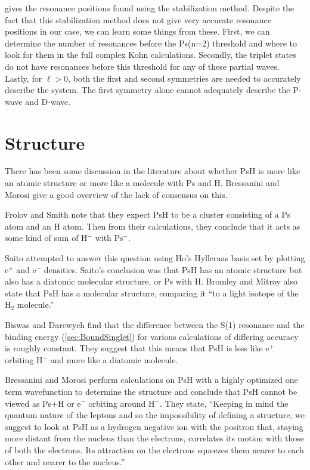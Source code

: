 \documentclass[Dissertation.tex]{subfiles}
\begin{document}
 gives the resonance positions found using the stabilization method. Despite the fact that this stabilization method does not give very accurate resonance positions in our case, we can learn some things from these. First, we can determine the number of resonances before the Ps(n=2) threshold and where to look for them in the full complex Kohn calculations. Secondly, the triplet states do not have resonances before this threshold for any of these partial waves. Lastly, for $\ell > 0$, both the first and second symmetries are needed to accurately describe the system. The first symmetry alone cannot adequately describe the P-wave and D-wave.


\section{Structure}
\label{sec:PsHStructure}
There has been some discussion in the literature about whether PsH is more like an atomic structure or more like a molecule with Ps and H. Bressanini and Morosi \cite{Bressanini2003} give a good overview of the lack of consensus on this. 

Frolov and Smith \cite{Frolov1997c} note that they expect PsH to be a cluster consisting of a Ps atom and an H atom. Then from their calculations, they conclude that it acts as some kind of sum of H$^-$ with Ps$^-$.

Saito \cite{Saito2000} attempted to answer this question using Ho's \cite{Ho1986} Hylleraas basis set by plotting e$^+$ and e$^-$ densities. Saito's conclusion was that PsH has an atomic structure but also has a diatomic molecular structure, or Ps with H. Bromley and Mitroy \cite{Bromley2001} also state that PsH has a molecular structure, comparing it ``to a light isotope of the H$_2$ molecule.''

Biswas and Darewych \cite{Biswas2002} find that the difference between the S(1) resonance and the binding energy (\cref{sec:BoundSinglet}) for various calculations of differing accuracy is roughly constant. They suggest that this means that PsH is less like e$^+$ orbiting H$^-$ and more like a diatomic molecule.

\cite{Mitroy2002}

Bressanini and Morosi \cite{Bressanini2003} perform calculations on PsH with a highly optimized one term wavefunction to determine the structure and conclude that PsH cannot be viewed as Ps+H or e$^-$ orbiting around H$^-$. They state, ``Keeping in mind the quantum nature of the leptons and so the impossibility of defining a structure, we suggest to look at PsH as a hydrogen negative ion with the positron that, staying more distant from the nucleus than the electrons, correlates its motion with those of both the electrons. Its attraction on the electrons squeezes them nearer to each other and nearer to the nucleus.''


\biblio
\end{document}
